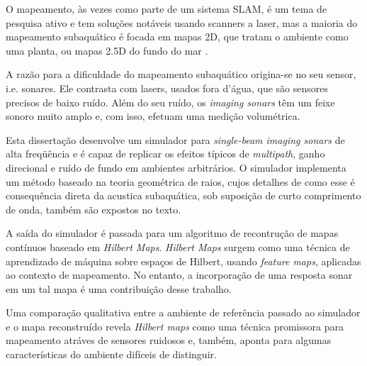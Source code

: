 O mapeamento, \`as vezes como parte de um sistema SLAM, \'e um tema de pesquisa
ativo e tem solu\c{c}\~oes not\'aveis usando scanners a laser, mas a maioria
do mapeamento subaqu\'atico \'e focada em mapas 2D, que tratam o ambiente como
uma planta, ou mapas 2.5D do fundo do mar .

A raz\~ao para a dificuldade do mapeamento subaqu\'atico origina-se no seu
sensor, i.e. sonares. Ele contrasta com lasers, usados fora d'\'agua, que
s\~ao sensores precisos de baixo ru\'ido. Al\'em do seu ru\'ido, os
\textit{imaging sonars} t\^em um feixe sonoro muito amplo e, com isso, efetuam
uma medi\c{c}\~ao volum\'etrica.

Esta disserta\c{c}\~ao desenvolve um simulador para \textit{single-beam imaging
sonars} de alta freqü\^encia e \'e capaz de replicar os efeitos t\'ipicos de
\textit{multipath}, ganho direcional e ru\'ido de fundo em ambientes
arbitr\'arios.
O simulador implementa um m\'etodo baseado na teoria geom\'etrica de raios,
cujos detalhes de como esse \'e consequ\^encia direta da acustica
subaqu\'atica, sob suposi\c{c}\~ao de curto comprimento de onda, também são
expostos no texto.

A sa\'ida do simulador \'e passada para um algoritmo de recontrução de mapas
cont\'inuos baseado em \textit{Hilbert Maps}. \textit{Hilbert Maps} surgem como
uma técnica de aprendizado de máquina sobre espa\c{c}os de Hilbert, usando
\textit{feature maps}, aplicadas ao contexto de mapeamento. No entanto, a
incorpora\c{c}\~ao de uma resposta sonar em um tal mapa \'e uma
contribui\c{c}\~ao desse trabalho.

Uma compara\c{c}\~ao qualitativa entre a ambiente de referência passado ao
simulador e o mapa reconstru\'ido revela \textit{Hilbert maps} como uma t\'ecnica
promissora para mapeamento atráves de sensores ruidosos e, tamb\'em, aponta para
algumas caracter\'isticas do ambiente dif\'iceis de distinguir.